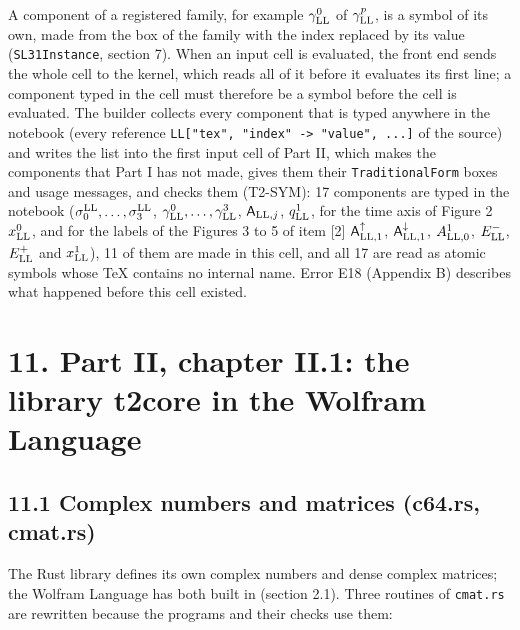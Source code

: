 \documentclass[
  10pt,
]{article}
\begin{document}
A component of a registered family, for example \(\gamma^0_{\rm LL}\) of
\(\gamma^p_{\rm LL}\), is a symbol of its own, made from the box of the
family with the index replaced by its value (\texttt{SL31Instance},
section 7). When an input cell is evaluated, the front end sends the
whole cell to the kernel, which reads all of it before it evaluates its
first line; a component typed in the cell must therefore be a symbol
before the cell is evaluated. The builder collects every component that
is typed anywhere in the notebook (every reference
\texttt{LL{[}"tex",\ "index"\ -\textgreater{}\ "value",\ ...{]}} of the
source) and writes the list into the first input cell of Part II, which
makes the components that Part I has not made, gives them their
\texttt{TraditionalForm} boxes and usage messages, and checks them
(T2-SYM): 17 components are typed in the notebook
(\(\sigma^{\rm LL}_0,\dots,\sigma^{\rm LL}_3\),
\(\gamma^0_{\rm LL},\dots,\gamma^3_{\rm LL}\),
\(\mathsf A_{{\rm LL},j}\), \(q^1_{\rm LL}\), for the time axis of
Figure 2 \(x^0_{\rm LL}\), and for the labels of the Figures 3 to 5 of
item {[}2{]} \(\mathsf A^\uparrow_{{\rm LL},1}\),
\(\mathsf A^\downarrow_{{\rm LL},1}\), \(A^1_{{\rm LL},0}\),
\(E^-_{\rm LL}\), \(E^+_{\rm LL}\) and \(x^1_{\rm LL}\)), 11 of them are
made in this cell, and all 17 are read as atomic symbols whose TeX
contains no internal name. Error E18 (Appendix B) describes what
happened before this cell existed.

\hypertarget{part-ii-chapter-ii.1-the-library-t2core-in-the-wolfram-language}{%
\section{11. Part II, chapter II.1: the library t2core in the Wolfram
Language}\label{part-ii-chapter-ii.1-the-library-t2core-in-the-wolfram-language}}

\hypertarget{complex-numbers-and-matrices-c64.rs-cmat.rs}{%
\subsection{11.1 Complex numbers and matrices (c64.rs,
cmat.rs)}\label{complex-numbers-and-matrices-c64.rs-cmat.rs}}

The Rust library defines its own complex numbers and dense complex
matrices; the Wolfram Language has both built in (section 2.1). Three
routines of \texttt{cmat.rs} are rewritten because the programs and
their checks use them:
\end{document}
